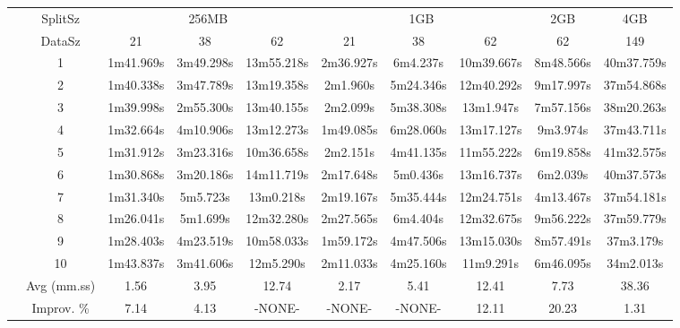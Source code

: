 \begin{tabularx}{\linewidth}{*{10}{c|}}
\cline{2-10}
& SplitSz 
& \multicolumn{3}{c|}{256MB} & \multicolumn{3}{c|}{1GB}  & \multicolumn{1}{c|}{2GB} & \multicolumn{1}{c|}{4GB} \\
\cline{2-10}
& DataSz 
& 21 & 38 & 62 & 21 & 38 & 62 & 62 & 149 \\
\cline{2-10}
& 1
& 1m41.969s & 3m49.298s & 13m55.218s & 2m36.927s & 6m4.237s & 10m39.667s & 8m48.566s & 40m37.759s \\
\cline{2-10}
& 2
& 1m40.338s & 3m47.789s & 13m19.358s & 2m1.960s & 5m24.346s & 12m40.292s & 9m17.997s & 37m54.868s \\
\cline{2-10}
& 3
& 1m39.998s & 2m55.300s & 13m40.155s & 2m2.099s & 5m38.308s & 13m1.947s & 7m57.156s & 38m20.263s \\
\cline{2-10}
& 4
& 1m32.664s & 4m10.906s & 13m12.273s & 1m49.085s & 6m28.060s & 13m17.127s & 9m3.974s & 37m43.711s \\
\cline{2-10}
& 5
& 1m31.912s & 3m23.316s & 10m36.658s & 2m2.151s & 4m41.135s & 11m55.222s & 6m19.858s & 41m32.575s \\
\cline{2-10}
& 6
& 1m30.868s & 3m20.186s & 14m11.719s & 2m17.648s & 5m0.436s & 13m16.737s & 6m2.039s & 40m37.573s \\
\cline{2-10}
& 7
&  1m31.340s & 5m5.723s & 13m0.218s & 2m19.167s & 5m35.444s & 12m24.751s & 4m13.467s & 37m54.181s \\
\cline{2-10}
& 8
& 1m26.041s & 5m1.699s & 12m32.280s & 2m27.565s & 6m4.404s & 12m32.675s & 9m56.222s & 37m59.779s \\
\cline{2-10}
& 9
& 1m28.403s & 4m23.519s & 10m58.033s & 1m59.172s & 4m47.506s & 13m15.030s & 8m57.491s & 37m3.179s \\
\cline{2-10}
& 10
& 1m43.837s & 3m41.606s & 12m5.290s & 2m11.033s & 4m25.160s & 11m9.291s & 6m46.095s & 34m2.013s \\
\cline{2-10}
& Avg (mm.ss)
& 1.56 & 3.95 & 12.74 & 2.17 & 5.41 & 12.41 & 7.73 & 38.36 \\
\cline{2-10}
& Improv. \%
& 7.14 & 4.13 & -NONE- & -NONE- & -NONE- & 12.11 & 20.23 & 1.31 \\
\cline{2-10}
\end{tabularx}
